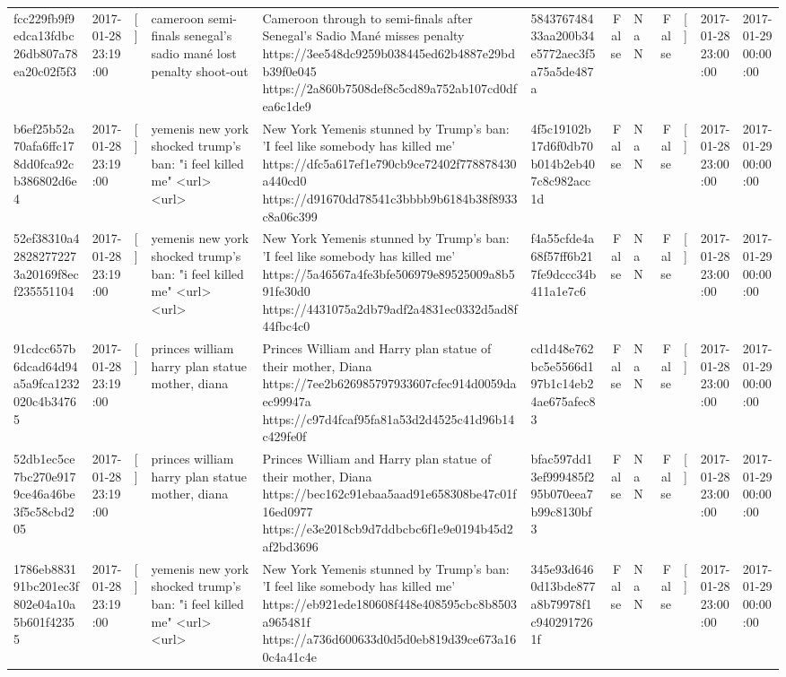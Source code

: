 \begin{tabular}{llllllrlrlll}
fcc229fb9f9edca13fdbc26db807a78ea20c02f5f3 & 2017-01-28 23:19:00 & [] & cameroon semi-finals senegal's sadio mané lost penalty shoot-out & Cameroon through to semi-finals after Senegal’s Sadio Mané misses penalty https://3ee548dc9259b038445ed62b4887e29bdb39f0e045 https://2a860b7508def8c5cd89a752ab107cd0dfea6c1de9 & 584376748433aa200b34e5772aec3f5a75a5de487a & False & NaN & False & [] & 2017-01-28 23:00:00 & 2017-01-29 00:00:00 \\
b6ef25b52a70afa6ffc178dd0fca92cb386802d6e4 & 2017-01-28 23:19:00 & [] & yemenis new york shocked trump's ban: "i feel killed me" <url> <url> & New York Yemenis stunned by Trump's ban: 'I feel like somebody has killed me' https://dfc5a617ef1e790cb9ce72402f778878430a440cd0 https://d91670dd78541c3bbbb9b6184b38f8933c8a06c399 & 4f5c19102b17d6f0db70b014b2eb407c8c982acc1d & False & NaN & False & [] & 2017-01-28 23:00:00 & 2017-01-29 00:00:00 \\
52ef38310a428282772273a20169f8ecf235551104 & 2017-01-28 23:19:00 & [] & yemenis new york shocked trump's ban: "i feel killed me" <url> <url> & New York Yemenis stunned by Trump's ban: 'I feel like somebody has killed me' https://5a46567a4fe3bfe506979e89525009a8b591fe30d0 https://4431075a2db79adf2a4831ec0332d5ad8f44fbc4c0 & f4a55cfde4a68f57ff6b217fe9dccc34b411a1e7c6 & False & NaN & False & [] & 2017-01-28 23:00:00 & 2017-01-29 00:00:00 \\
91cdcc657b6dcad64d94a5a9fca1232020c4b34765 & 2017-01-28 23:19:00 & [] & princes william harry plan statue mother, diana & Princes William and Harry plan statue of their mother, Diana https://7ee2b626985797933607cfec914d0059daec99947a https://c97d4fcaf95fa81a53d2d4525c41d96b14c429fe0f & cd1d48e762bc5e5566d197b1c14eb24ae675afec83 & False & NaN & False & [] & 2017-01-28 23:00:00 & 2017-01-29 00:00:00 \\
52db1ec5ce7bc270e9179ce46a46be3f5c58cbd205 & 2017-01-28 23:19:00 & [] & princes william harry plan statue mother, diana & Princes William and Harry plan statue of their mother, Diana https://bec162c91ebaa5aad91e658308be47c01f16ed0977 https://e3e2018cb9d7ddbcbc6f1e9e0194b45d2af2bd3696 & bfac597dd13ef999485f295b070eea7b99c8130bf3 & False & NaN & False & [] & 2017-01-28 23:00:00 & 2017-01-29 00:00:00 \\
1786eb883191bc201ec3f802e04a10a5b601f42355 & 2017-01-28 23:19:00 & [] & yemenis new york shocked trump's ban: "i feel killed me" <url> <url> & New York Yemenis stunned by Trump's ban: 'I feel like somebody has killed me' https://eb921ede180608f448e408595cbc8b8503a965481f https://a736d600633d0d5d0eb819d39ce673a160c4a41c4e & 345e93d6460d13bde877a8b79978f1c9402917261f & False & NaN & False & [] & 2017-01-28 23:00:00 & 2017-01-29 00:00:00 \\

\end{tabular}
